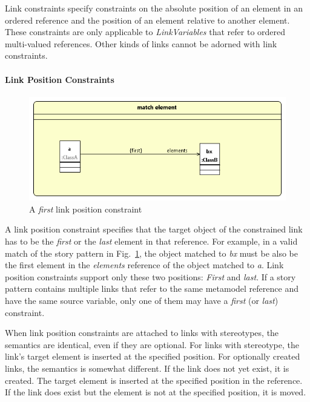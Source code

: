 {



Link constraints specify constraints on the absolute position of an element in an ordered reference and the position of an element relative to another element. These constraints are only applicable to \emph{LinkVariables} that refer to ordered multi-valued references. Other kinds of links cannot be adorned with link constraints.

\paragraph{Link Position Constraints}

\begin{figure}[htb]
\center
\includegraphics[width=0.75\columnwidth]{figures/linkPositionConstraint1.png}
\caption{A \emph{first} link position constraint}
\label{fig:linkPositionConstraints:linkPositionConstraint1}
\end{figure}

A link position constraint specifies that the target object of the constrained link has to be the \emph{first} or the \emph{last} element in that reference. For example, in a valid match of the story pattern in Fig.~\ref{fig:linkPositionConstraints:linkPositionConstraint1}, the object matched to \emph{bx} must be also be the first element in the \emph{elements} reference of the object matched to \emph{a}. Link position constraints support only these two positions: \emph{First} and \emph{last}. If a story pattern contains multiple links that refer to the same metamodel reference and have the same source variable, only one of them may have a \emph{first} (or \emph{last}) constraint.

When link position constraints are attached to links with \destroy stereotypes, the semantics are identical, even if they are optional. For links with \create stereotype, the link's target element is inserted at the specified position. For optionally created links, the semantics is somewhat different. If the link does not yet exist, it is created. The target element is inserted at the specified position in the reference. If the link does exist but the element is not at the specified position, it is moved.

}
